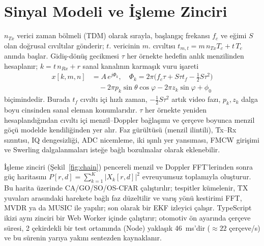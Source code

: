 \documentclass[conference,a4paper,10pt]{IEEEtran}
\begin{document}
\section{Sinyal Modeli ve İşleme Zinciri}
$n_{Tx}$ verici zaman bölmeli (TDM) olarak sırayla, başlangıç frekansı $f_c$ ve eğimi $S$ olan doğrusal cıvıltılar gönderir; $t$. vericinin $m$. cıvıltısı $t_{m,t}=m\,n_{Tx}T_c+t\,T_c$ anında başlar. Gidiş-dönüş gecikmesi $\tau$ her örnekte hedefin anlık menzilinden hesaplanır; $k=t\,n_{Rx}+r$ sanal kanalının karmaşık vuru işareti
\begin{equation}
\begin{aligned}
x[k,m,n]&=A\,e^{j\Phi_k},\quad \Phi_k=2\pi\big(f_c\tau+S\tau t_f-\tfrac{1}{2}S\tau^2\big)\\
&\quad-2\pi p_k\sin\theta\cos\varphi-2\pi z_k\sin\varphi+\phi_0
\end{aligned}
\label{eq:beat}
\end{equation}
biçimindedir. Burada $t_f$ cıvıltı içi hızlı zaman, $-\tfrac12 S\tau^2$ artık video fazı, $p_k,z_k$ dalga boyu cinsinden sanal eleman konumlarıdır. $\tau$ her örnekte yeniden hesaplandığından cıvıltı içi menzil--Doppler bağlaşımı ve çerçeve boyunca menzil göçü modelde kendiliğinden yer alır. Faz gürültüsü (menzil ilintili), Tx--Rx sızıntısı, IQ dengesizliği, ADC nicemleme, iki ışınlı yer yansıması, FMCW girişimi ve Swerling dalgalanmaları isteğe bağlı bozulmalar olarak eklenebilir.

İşleme zinciri (Şekil~\ref{fig:chain}) pencereli menzil ve Doppler FFT'lerinden sonra güç haritasını $P[r,d]=\sum_{k=1}^{K}|X_k[r,d]|^2$ evreuyumsuz toplamıyla oluşturur. Bu harita üzerinde CA/GO/SO/OS-CFAR \cite{rohling1983radar,gandhi1988analysis} çalıştırılır; tespitler kümelenir, TX yuvaları arasındaki harekete bağlı faz düzeltilir \cite{bechter2017compensation} ve varış yönü kestirimi FFT, MVDR ya da MUSIC ile yapılır; son olarak bir EKF izleyici çalışır. TypeScript ikizi aynı zinciri bir Web Worker içinde çalıştırır; otomotiv ön ayarında çerçeve süresi, 2 çekirdekli bir test ortamında (Node) yaklaşık 46~ms'dir (${\approx}22$ çerçeve/s) ve bu sürenin yarıya yakını sentezden kaynaklanır.
\end{document}
